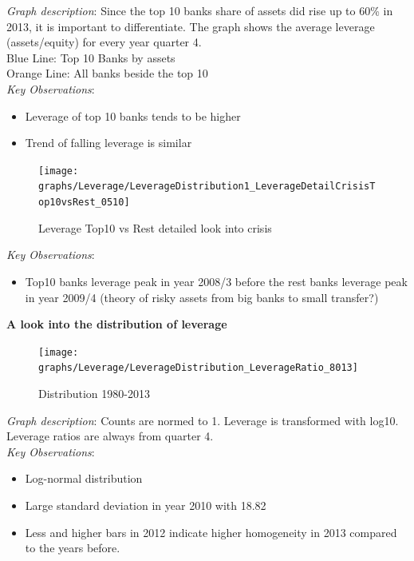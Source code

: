 \documentclass[12pt, a4paper]{article} %
\begin{document}
\newpage

\noindent \textit{Graph description}: Since the top 10 banks share of assets did rise up to 60\% in 2013, it is important to differentiate. The graph shows the average leverage (assets/equity) for every year quarter 4.\\ Blue Line: Top 10 Banks by assets\\
Orange Line: All banks beside the top 10\\

\noindent \textit{Key Observations}:
\begin{itemize}
\item Leverage of top 10 banks tends to be higher
\item Trend of falling leverage is similar
\end{itemize}




\begin{figure}[hbtp]
\centering
\caption{Leverage Top10 vs Rest detailed look into crisis}
\texttt{[image: graphs/Leverage/LeverageDistribution1\_LeverageDetailCrisisTop10vsRest\_0510]}
\end{figure}


\noindent \textit{Key Observations}:
\begin{itemize}
\item Top10 banks leverage peak in year 2008/3 before the rest banks leverage peak in year 2009/4 (theory of risky assets from big banks to small transfer?) 
\end{itemize}
\fi
\pagebreak

\textbf{A look into the distribution of leverage}\\



\begin{figure}[hbtp]
\centering
\caption{Distribution 1980-2013}
\texttt{[image: graphs/Leverage/LeverageDistribution\_LeverageRatio\_8013]}
\end{figure}

\noindent \textit{Graph description}: Counts are normed to 1. Leverage is transformed with log10. Leverage ratios are always from quarter 4.
\\

\noindent \textit{Key Observations}:
\begin{itemize}
\item Log-normal distribution
\item Large standard deviation in year 2010 with 18.82
\item Less and higher bars in 2012 indicate higher homogeneity in 2013 compared to the years before.
\end{itemize}
\end{document}
